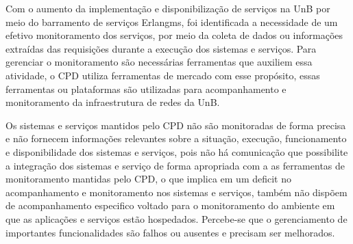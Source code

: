 Com o aumento da implementação e disponibilização de serviços na \acrfull{UnB} por meio do barramento de serviços Erlangms\cite{Agilar}, foi identificada a necessidade de um efetivo monitoramento dos serviços, por meio da coleta de dados ou informações extraídas das requisições durante a execução dos sistemas e serviços. Para gerenciar o monitoramento são necessárias ferramentas que auxiliem essa atividade, o \acrfull{CPD} utiliza ferramentas de mercado com esse propósito, essas ferramentas ou plataformas são utilizadas para acompanhamento e monitoramento da infraestrutura de redes da \acrshort{UnB}.

Os sistemas e serviços mantidos pelo \acrshort{CPD} não são monitoradas de forma precisa e não fornecem informações relevantes sobre a situação, execução, funcionamento e disponibilidade dos sistemas e serviços, pois não há comunicação que possibilite a integração dos sistemas e serviço de forma apropriada com a as ferramentas de monitoramento mantidas pelo \acrshort{CPD}, o que implica em um deficit no acompanhamento e monitoramento nos sistemas e serviços, também não dispõem de acompanhamento especifico voltado para o monitoramento do ambiente em que as aplicações e serviços estão hospedados. Percebe-se que o gerenciamento de importantes funcionalidades são falhos ou ausentes e precisam ser melhorados.


